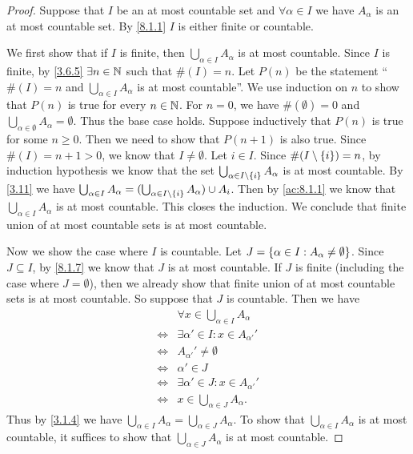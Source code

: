 \begin{proof}
	Suppose that \(I\) be an at most countable set and \(\forall \alpha \in I\) we have \(A_{\alpha}\) is an at most countable set.
	By \cref{8.1.1} \(I\) is either finite or countable.

	We first show that if \(I\) is finite, then \(\bigcup_{\alpha \in I} A_{\alpha}\) is at most countable.
	Since \(I\) is finite, by \cref{3.6.5} \(\exists n \in \mathbb{N}\) such that \(\#(I) = n\).
	Let \(P(n)\) be the statement ``\(\#(I) = n\) and \(\bigcup_{\alpha \in I} A_{\alpha}\) is at most countable''.
	We use induction on \(n\) to show that \(P(n)\) is true for every \(n \in \mathbb{N}\).
	For \(n = 0\), we have \(\#(\emptyset) = 0\) and \(\bigcup_{\alpha \in \emptyset} A_{\alpha} = \emptyset\).
	Thus the base case holds.
	Suppose inductively that \(P(n)\) is true for some \(n \geq 0\).
	Then we need to show that \(P(n + 1)\) is also true.
	Since \(\#(I) = n + 1 > 0\), we know that \(I \neq \emptyset\).
	Let \(i \in I\).
	Since \(\#(I \setminus \left\lbrace i\right\rbrace) = n\), by induction hypothesis we know that the set \(\bigcup_{\alpha \in I \setminus \left\lbrace i\right\rbrace} A_{\alpha}\) is at most countable.
	By \cref{3.11} we have \(\bigcup_{\alpha \in I} A_{\alpha} = (\bigcup_{\alpha \in I \setminus \left\lbrace i\right\rbrace} A_{\alpha}) \cup A_i\).
	Then by \cref{ac:8.1.1} we know that \(\bigcup_{\alpha \in I} A_{\alpha}\) is at most countable.
	This closes the induction.
	We conclude that finite union of at most countable sets is at most countable.

	Now we show the case where \(I\) is countable.
	Let \(J = \left\lbrace\alpha \in I : A_{\alpha} \neq \emptyset\right\rbrace\).
	Since \(J \subseteq I\), by \cref{8.1.7} we know that \(J\) is at most countable.
	If \(J\) is finite (including the case where \(J = \emptyset\)), then we already show that finite union of at most countable sets is at most countable.
	So suppose that \(J\) is countable.
	Then we have
	\begin{align*}
		     & \forall x \in \bigcup_{\alpha \in I} A_{\alpha} \\
		\iff & \exists \alpha' \in I : x \in A_{\alpha'}'      \\
		\iff & A_{\alpha'}' \neq \emptyset                     \\
		\iff & \alpha' \in J                                   \\
		\iff & \exists \alpha' \in J : x \in A_{\alpha'}'      \\
		\iff & x \in \bigcup_{\alpha \in J} A_{\alpha}.
	\end{align*}
	Thus by \cref{3.1.4} we have \(\bigcup_{\alpha \in I} A_{\alpha} = \bigcup_{\alpha \in J} A_{\alpha}\).
	To show that \(\bigcup_{\alpha \in I} A_{\alpha}\) is at most countable, it suffices to show that \(\bigcup_{\alpha \in J} A_{\alpha}\) is at most countable.


\end{proof}
